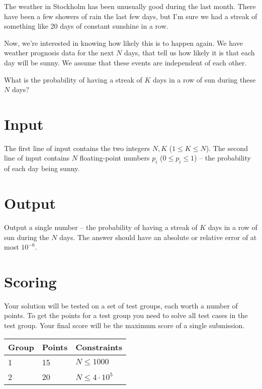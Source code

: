 The weather in Stockholm has been unusually good during the last month.
There have been a few showers of rain the last few days, but I'm sure
we had a streak of something like 20 days of constant sunshine in a row.

Now, we're interested in knowing how likely this is to happen again.
We have weather prognosis data for the next $N$ days, that
tell us how likely it is that each day will be sunny.
We assume that these events are independent of each other.

What is the probability of having a streak of $K$ days in a row
of sun during these $N$ days?

\section*{Input}
The first line of input contains the two integers $N, K$ ($1 \le K \le N$).
The second line of input contains $N$ floating-point numbers $p_i$ ($0 \le p_i \le 1$) --
the probability of each day being sunny.

\section*{Output}
Output a single number -- the probability of having a streak of $K$ days in a row
of sun during the $N$ days.
The answer should have an absolute or relative error of at most $10^{-6}$.

\section*{Scoring}
Your solution will be tested on a set of test groups, each worth a number of points.
To get the points for a test group you need to solve all test cases in the test group.
Your final score will be the maximum score of a single submission.

\noindent
\begin{tabular}{| l | l | l |}
\hline
Group & Points & Constraints \\ \hline
1     & 15     & $N \le 1000$ \\ \hline
2     & 20     & $N \le 4 \cdot 10^5$ \\ \hline
\end{tabular}
